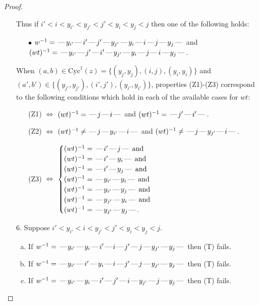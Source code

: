\documentclass[10pt]{article}
\theoremstyle{definition}
\theoremstyle{definition}
\def\dash{\text{\hspace{0.5mm}---\hspace{0.5mm}}}
\def\Cyc{\mathrm{Cyc}}
\begin{document}
\begin{proof}
\begin{enumerate}
\begin{enumerate}[(a)]
\end{enumerate}
Thus if $i' < i < y_{i'} < y_{j'} < j' < y_i < y_j < j$ then one of the following holds:
\begin{enumerate}
\item[$\bullet$] $w^{-1} = \dash y_{i'}\dash i'\dash j'\dash y_{j'}\dash y_i\dash i\dash j\dash y_j\dash $ and $(wt)^{-1} = \dash y_{i'}\dash j'\dash i'\dash y_{j'}\dash y_i\dash j\dash i\dash y_j\dash $.
\end{enumerate}
When $(a,b)\in\Cyc^1(z)=\{(y_j,y_j),(i,j),(y_i,y_i)\}$ and $(a',b')\in\{(y_{j'},y_{j'}),(i',j'),(y_{i'},y_{i'})\}$,
properties (Z1)-(Z3) correspond to the following conditions which
hold in each of the available cases for $wt$:
\begin{enumerate}
\item[](Z1) $\Leftrightarrow$ $(wt)^{-1} = \dash j \dash i \dash$  and $(wt)^{-1} = \dash j' \dash i' \dash$.
\item[](Z2) $\Leftrightarrow$ $(wt)^{-1} \neq \dash j \dash y_{i'} \dash i \dash$  and $(wt)^{-1} \neq \dash j \dash y_{j'} \dash i \dash$.
\item[](Z3) $\Leftrightarrow$ $\begin{cases}\text{$(wt)^{-1} = \dash i' \dash j \dash$}\text{ and }\\
\text{$(wt)^{-1} = \dash i' \dash y_i \dash$}\text{ and }\\
\text{$(wt)^{-1} = \dash i' \dash y_j \dash$}\text{ and }\\
\text{$(wt)^{-1} = \dash y_{i'} \dash y_i \dash$}\text{ and }\\
\text{$(wt)^{-1} = \dash y_{i'} \dash y_j \dash$}\text{ and }\\
\text{$(wt)^{-1} = \dash y_{j'} \dash y_i \dash$}\text{ and }\\
\text{$(wt)^{-1} = \dash y_{j'} \dash y_j \dash$}.\end{cases}$
\end{enumerate}
\item[$6$.] Suppose $i' < y_{i'} < i < y_{j'} < j' < y_i < y_j < j$.
\begin{enumerate}[(a)]
\item If $w^{-1} = \dash y_{i'}\dash y_i\dash i'\dash i\dash j'\dash j\dash y_{j'}\dash y_j\dash $ then (T) fails.
\item If $w^{-1} = \dash y_{i'}\dash i'\dash y_i\dash i\dash j'\dash j\dash y_{j'}\dash y_j\dash $ then (T) fails.
\item If $w^{-1} = \dash y_{i'}\dash y_i\dash i'\dash j'\dash i\dash y_{j'}\dash j\dash y_j\dash $ then (T) fails.

\end{enumerate}
\end{enumerate}
\end{proof}
\end{document}
